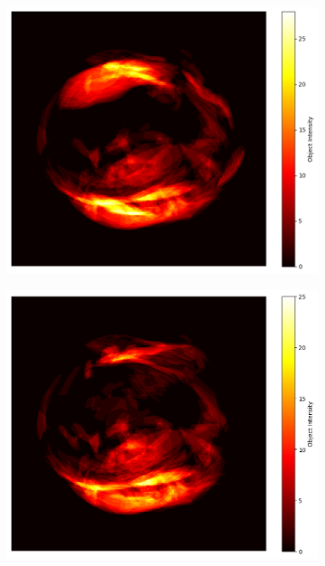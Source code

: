 \begin{figure}[h!]
    \begin{subfigure}{0.33\textwidth}
        \includegraphics[width=\linewidth]{Images/chapter2/fold3_heatmap.png}
        \caption{}
        \label{fig:fold3}
    \end{subfigure}\hfil
    \begin{subfigure}{0.33\textwidth}
        \includegraphics[width=\linewidth]{Images/chapter2/fold4_heatmap.png}
        \caption{}
        \label{fig:fold4}
    \end{subfigure}\hfil

\end{figure}
